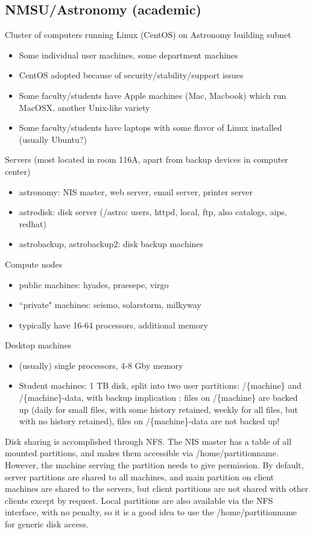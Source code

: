 \documentclass{article}
\begin{document}
\subsection{NMSU/Astronomy (academic)}
Cluster of computers running Linux (CentOS) on Astronomy building
subnet
\begin{itemize}
    \item Some individual user machines, some department machines
    \item CentOS adopted because of security/stability/support issues
    \item Some faculty/students have Apple machines (Mac, Macbook) which run
        MacOSX, another Unix-like variety
    \item Some faculty/students have laptops with some flavor of Linux
        installed (usually Ubuntu?)
\end{itemize}
Servers (most located in room 116A, apart from backup devices in
computer center)
\begin{itemize}
    \item astronomy: NIS master, web server, email server, printer server
    \item astrodisk: disk server (/astro: users, httpd, local, ftp, also
        catalogs, aips, redhat)
    \item astrobackup, astrobackup2: disk backup machines
\end{itemize}
Compute nodes
\begin{itemize}
    \item public machines: hyades, praesepe, virgo
    \item ``private" machines: seismo, solarstorm, milkyway
    \item typically have 16-64 processors, additional memory
\end{itemize}
Desktop machines
\begin{itemize}
    \item (usually) single processors, 4-8 Gby memory
    \item Student machines: 1 TB disk, split into two user partitions:
        /\{machine\} and /\{machine\}-data, with backup implication : files on
        /\{machine\} are backed up (daily for small files, with some history
        retained, weekly for all files, but with no history retained), files
        on /\{machine\}-data are not backed up!
\end{itemize}
Disk sharing is accomplished through NFS\@. The NIS master has a table
of all mounted partitions, and makes them accessible via
/home/partitionname. However, the machine serving the partition needs
to give permission. By default, server partitions are shared to all
machines, and main partition on client machines are shared to the
servers, but client partitions are not shared with other clients
except by request. Local partitions are also available via the NFS
interface, with no penalty, so it is a good idea to use the
/home/partitionname for generic disk access.
\end{document}
